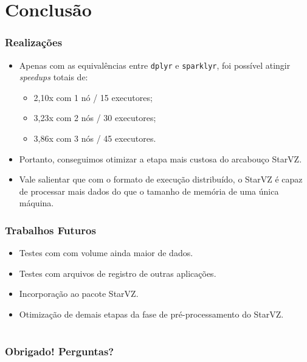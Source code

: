 \documentclass{beamer}
\begin{document}
\section{Conclusão}

\begin{frame}
 \frametitle{Realizações}
 \begin{itemize}
  \item Apenas com as equivalências entre \texttt{dplyr} e \texttt{sparklyr}, 
foi possível atingir \emph{speedups} totais de:	
    \begin{itemize}
      \item 2,10x com 1 nó / 15 executores;
      \item 3,23x com 2 nós / 30 executores;
      \item 3,86x com 3 nós / 45 executores.
    \end{itemize}
  \item Portanto, conseguimos otimizar a etapa mais custosa do arcabouço StarVZ.
  \item Vale salientar que com o formato de execução distribuído, o StarVZ é 
capaz de processar mais dados do que o tamanho de memória de uma única máquina.
 \end{itemize}
\end{frame}

\begin{frame}
 \frametitle{Trabalhos Futuros}
 \begin{itemize}
  \item Testes com com volume ainda maior de dados.
  \item Testes com arquivos de registro de outras aplicações.
  \item Incorporação ao pacote StarVZ.
  \item Otimização de demais etapas da fase de pré-processamento do StarVZ.
 \end{itemize}
\end{frame}


\section*{}
\begin{frame}
    \frametitle{Obrigado! Perguntas?}
    \InfContacts
\end{frame}
\end{document}
